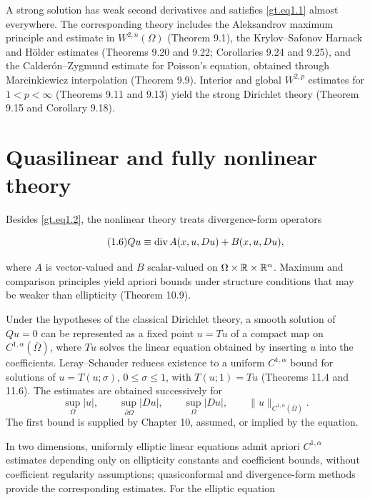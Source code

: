 A strong solution has weak second derivatives and satisfies
\eqref{gt.eq1.1} almost everywhere. The corresponding theory includes the
Aleksandrov maximum principle and estimate in $W^{2,n}(\Omega)$ (Theorem 9.1),
the Krylov--Safonov Harnack and H\"older estimates (Theorems 9.20 and 9.22;
Corollaries 9.24 and 9.25), and the Calder\'on--Zygmund estimate for Poisson's
equation, obtained through Marcinkiewicz interpolation (Theorem 9.9). Interior
and global $W^{2,p}$ estimates for
$1<p<\infty$ (Theorems 9.11 and 9.13) yield the strong Dirichlet theory
(Theorem 9.15 and Corollary 9.18).

\section*{Quasilinear and fully nonlinear theory}

Besides \eqref{gt.eq1.2}, the nonlinear theory treats divergence-form operators

\begin{equation}\label{gt.eq1.9}
\tag{1.6}
Qu \equiv \operatorname{div} A(x, u, Du) + B(x, u, Du),
\end{equation}

where $A$ is vector-valued and $B$ scalar-valued on
$\Omega\times\mathbb{R}\times\mathbb{R}^n$. Maximum and comparison principles yield apriori
bounds under structure conditions that may be weaker than ellipticity
(Theorem 10.9).

Under the hypotheses of the classical Dirichlet theory, a smooth solution of
$Qu=0$ can be represented as a fixed point $u=Tu$ of a compact map on
$C^{1,\alpha}(\overline\Omega)$, where $Tu$ solves the linear equation obtained by
inserting $u$ into the coefficients. Leray--Schauder reduces existence to a uniform
$C^{1,\alpha}$ bound for solutions of
$u=T(u;\sigma)$, $0\leq\sigma\leq1$, with $T(u;1)=Tu$ (Theorems 11.4 and
11.6). The estimates are obtained successively for
\[
\sup_{\Omega}|u|,\qquad
\sup_{\partial\Omega}|Du|,\qquad
\sup_{\Omega}|Du|,\qquad
\|u\|_{C^{1,\alpha}(\overline\Omega)}.
\]
The first bound is supplied by Chapter 10, assumed, or implied by the equation.

In two dimensions, uniformly elliptic linear equations admit apriori
$C^{1,\alpha}$ estimates depending only on ellipticity constants and coefficient
bounds, without coefficient regularity assumptions; quasiconformal and
divergence-form methods provide the corresponding estimates. For the elliptic
equation

